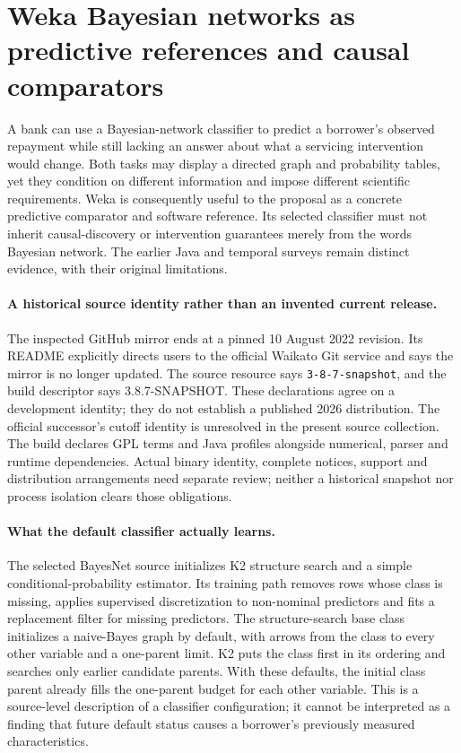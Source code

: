\section{Weka Bayesian networks as predictive references and causal comparators}
\label{sec:exec24-weka-reuse}

A bank can use a Bayesian-network classifier to predict a borrower's observed
repayment while still lacking an answer about what a servicing intervention
would change. Both tasks may display a directed graph and probability tables,
yet they condition on different information and impose different scientific
requirements. Weka is consequently useful to the proposal as a concrete
predictive comparator and software reference. Its selected classifier must not
inherit causal-discovery or intervention guarantees merely from the words
Bayesian network. The earlier Java and temporal surveys remain distinct
evidence, with their original limitations.~\citep{exec13_java_weka,exec15_javatemporal_weka,exec24_weka_source}

\paragraph{A historical source identity rather than an invented current release.}
The inspected GitHub mirror ends at a pinned 10 August 2022 revision. Its
README explicitly directs users to the official Waikato Git service and says
the mirror is no longer updated. The source resource says
\texttt{3-8-7-snapshot}, and the build descriptor says 3.8.7-SNAPSHOT. These
declarations agree on a development identity; they do not establish a published
2026 distribution. The official successor's cutoff identity is unresolved in
the present source collection. The build declares GPL terms and Java profiles
alongside numerical, parser and runtime dependencies. Actual binary identity,
complete notices, support and distribution arrangements need separate review;
neither a historical snapshot nor process isolation clears those obligations.
\citep{exec24_weka_source}

\paragraph{What the default classifier actually learns.}
The selected BayesNet source initializes K2 structure search and a simple
conditional-probability estimator. Its training path removes rows whose class
is missing, applies supervised discretization to non-nominal predictors and
fits a replacement filter for missing predictors. The structure-search base
class initializes a naive-Bayes graph by default, with arrows from the class
to every other variable and a one-parent limit. K2 puts the class first in
its ordering and searches only earlier candidate parents. With these defaults,
the initial class parent already fills the one-parent budget for each other
variable. This is a source-level description of a classifier configuration;
it cannot be interpreted as a finding that future default status causes a
borrower's previously measured characteristics.~\citep{exec24_weka_source}

